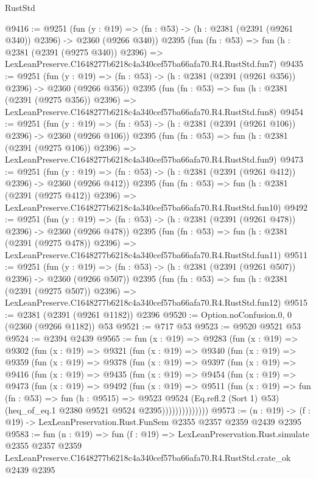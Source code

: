 \begin{lexlean}{RustStd}
\begin{coremodule}
@9416 := @9251
    (fun (y : @19) => (fn : @53) -> (h : @2381 (@2391 (@9261 @340)) @2396) -> @2360 (@9266 @340))
    @2395
    (fun (fn : @53) =>
    fun (h : @2381 (@2391 (@9275 @340)) @2396) =>
    LexLeanPreserve.C1648277b6218c4a340cef57ba66afa70.R4.RustStd.fun7)
@9435 := @9251
    (fun (y : @19) => (fn : @53) -> (h : @2381 (@2391 (@9261 @356)) @2396) -> @2360 (@9266 @356))
    @2395
    (fun (fn : @53) =>
    fun (h : @2381 (@2391 (@9275 @356)) @2396) =>
    LexLeanPreserve.C1648277b6218c4a340cef57ba66afa70.R4.RustStd.fun8)
@9454 := @9251
    (fun (y : @19) => (fn : @53) -> (h : @2381 (@2391 (@9261 @106)) @2396) -> @2360 (@9266 @106))
    @2395
    (fun (fn : @53) =>
    fun (h : @2381 (@2391 (@9275 @106)) @2396) =>
    LexLeanPreserve.C1648277b6218c4a340cef57ba66afa70.R4.RustStd.fun9)
@9473 := @9251
    (fun (y : @19) => (fn : @53) -> (h : @2381 (@2391 (@9261 @412)) @2396) -> @2360 (@9266 @412))
    @2395
    (fun (fn : @53) =>
    fun (h : @2381 (@2391 (@9275 @412)) @2396) =>
    LexLeanPreserve.C1648277b6218c4a340cef57ba66afa70.R4.RustStd.fun10)
@9492 := @9251
    (fun (y : @19) => (fn : @53) -> (h : @2381 (@2391 (@9261 @478)) @2396) -> @2360 (@9266 @478))
    @2395
    (fun (fn : @53) =>
    fun (h : @2381 (@2391 (@9275 @478)) @2396) =>
    LexLeanPreserve.C1648277b6218c4a340cef57ba66afa70.R4.RustStd.fun11)
@9511 := @9251
    (fun (y : @19) => (fn : @53) -> (h : @2381 (@2391 (@9261 @507)) @2396) -> @2360 (@9266 @507))
    @2395
    (fun (fn : @53) =>
    fun (h : @2381 (@2391 (@9275 @507)) @2396) =>
    LexLeanPreserve.C1648277b6218c4a340cef57ba66afa70.R4.RustStd.fun12)
@9515 := @2381 (@2391 (@9261 @1182)) @2396
@9520 := Option.noConfusion.{0, 0} (@2360 (@9266 @1182)) @53
@9521 := @717 @53
@9523 := @9520 @9521 @53
@9524 := @2394 @2439
@9565 := fun (x : @19) =>
  @9283
    (fun (x : @19) =>
    @9302
      (fun (x : @19) =>
      @9321
        (fun (x : @19) =>
        @9340
          (fun (x : @19) =>
          @9359
            (fun (x : @19) =>
            @9378
              (fun (x : @19) =>
              @9397
                (fun (x : @19) =>
                @9416
                  (fun (x : @19) =>
                  @9435
                    (fun (x : @19) =>
                    @9454
                      (fun (x : @19) =>
                      @9473
                        (fun (x : @19) =>
                        @9492
                          (fun (x : @19) =>
                          @9511
                            (fun (x : @19) =>
                            fun (fn : @53) =>
                            fun (h : @9515) =>
                            @9523
                              @9524
                              (Eq.refl.{2} (Sort 1) @53)
                              (heq_of_eq.{1} @2380 @9521 @9524 @2395))))))))))))))
@9573 := (n : @19) -> (f : @19) -> LexLeanPreservation.Rust.FunSem @2355 @2357 @2359 @2439 @2395
@9583 := fun (n : @19) =>
  fun (f : @19) =>
  LexLeanPreservation.Rust.simulate
    @2355
    @2357
    @2359
    LexLeanPreserve.C1648277b6218c4a340cef57ba66afa70.R4.RustStd.crate_ok
    @2439
    @2395
\end{coremodule}
\end{lexlean}
